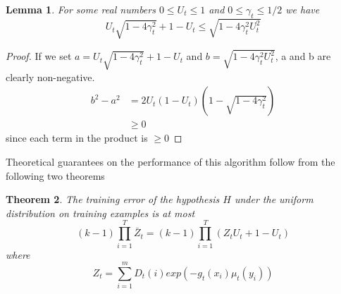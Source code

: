 \documentclass[11pt]{article}
\newtheorem{theorem}{Theorem}
\newtheorem{lemma}[theorem]{Lemma}
\begin{document}
\begin{lemma} \label{lemma10}
For some real numbers $0 \le U_t \le 1$ and $0 \le \gamma_t \le 1/2$ we have $$U_t \sqrt{1-4\gamma_t^2} + 1-U_t \le \sqrt{1-4\gamma_t^2U_t^2}$$
\end{lemma}
\begin{proof}
If we set $a = U_t \sqrt{1-4\gamma_t^2} + 1-U_t$ and $b = \sqrt{1-4\gamma_t^2U_t^2}$, a and b are clearly non-negative. 
\begin{align*}
b^2-a^2 &= 2U_t(1-U_t)(1-\sqrt{1-4\gamma_t^2})\\
&\ge 0
\end{align*}
since each term in the product is $\ge 0$
\end{proof}
Theoretical guarantees on the performance of this algorithm follow from the following two theorems
\begin{theorem}
The training error of the hypothesis $H$ under the uniform distribution on training examples is at most $$(k-1)\prod_{i=1}^T \bar Z_t = (k-1)\prod_{i=1}^T (Z_t U_t + 1-U_t)$$ where $$Z_t = \sum_{i=1}^m D_t(i) exp(-g_t(x_i)\mu_t(y_i))$$
\end{theorem}
\end{document}
